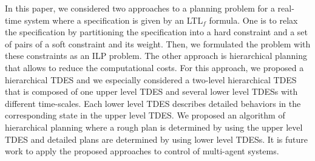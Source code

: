 \documentclass[journal,twoside,web]{IEEEtran}
\begin{document}
In this paper, we considered two approaches to a planning problem for a real-time system where a specification is given by an LTL$_f$ formula.
One is to relax the specification by partitioning the specification into a hard constraint and a set of pairs of a  soft constraint and its weight. 
Then, we formulated the problem with these constraints as an ILP problem.
The other approach is hierarchical planning that allows to reduce the computational costs.
For this approach, we proposed a hierarchical TDES and we especially considered a two-level hierarchical TDES that is composed of one upper level TDES and several lower level TDESs with different time-scales.
Each lower level TDES describes detailed behaviors in the corresponding state in the upper level TDES.
We proposed an algorithm of hierarchical planning where a rough plan is determined by using the upper level TDES and detailed plans are determined by using lower level TDESs.
%
It is future work to apply the proposed approaches to control of multi-agent systems.
%
%
%
%
\end{document}
